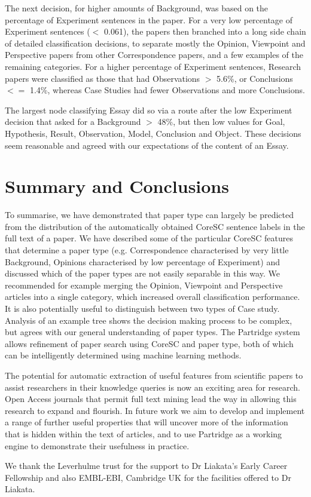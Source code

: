 \documentclass{svmult}
\begin{document}
The next decision, for higher amounts of Background, was based on the
percentage of Experiment sentences in the paper. For a very low
percentage of Experiment sentences ($<$ 0.061), the papers then
branched into a long side chain of detailed classification decisions,
to separate mostly the Opinion, Viewpoint and Perspective papers from
other Correspondence papers, and a few examples of the remaining
categories. For a higher percentage of Experiment sentences, Research
papers were classified as those that had Observations $>$ 5.6\%, or
Conclusions $<=$ 1.4\%, whereas Case Studies had fewer Observations
and more Conclusions.

The largest node classifying Essay did so via a route after the low
Experiment decision that asked for a Background $>$ 48\%, but then low
values for Goal, Hypothesis, Result, Observation, Model, Conclusion
and Object. These decisions seem reasonable and agreed with our
expectations of the content of an Essay.

\vspace{-15pt}
\section{Summary and Conclusions}
\label{sec:4}

To summarise, we have demonstrated that paper type can largely be predicted
from the distribution of the automatically obtained CoreSC sentence labels in
the full text of a paper. We have described some of the particular CoreSC
features that determine a paper type (e.g. Correspondence characterised by very
little Background, Opinions characterised by low percentage of Experiment) and
discussed which of the paper types are not easily separable in this way. We
recommended for example merging the Opinion, Viewpoint and Perspective articles
into a single category, which increased overall classification performance. It
is also potentially useful to distinguish between two types of Case study.
Analysis of an example tree shows the decision making process to be complex,
but agrees with our general understanding of paper types. The Partridge system
allows refinement of paper search using CoreSC and paper type, both of which
can be intelligently determined using machine learning methods.



The potential for automatic extraction of useful features from
scientific papers to assist researchers in their knowledge queries is
now an exciting area for research. Open Access journals that permit
full text mining lead the way in allowing this research to expand and
flourish. In future work we aim to develop and implement a range of
further useful properties that will uncover more of the information
that is hidden within the text of articles, and to use Partridge as a
working engine to demonstrate their usefulness in practice.


\begin{acknowledgement} We thank the Leverhulme trust for the support to Dr
Liakata's Early Career Fellowship and also EMBL-EBI, Cambridge UK for the
facilities offered to Dr Liakata.  \end{acknowledgement}


\vspace{-15pt}



%
\end{document}
